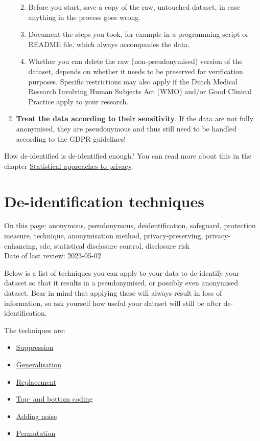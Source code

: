 \documentclass[
]{book}
\providecommand{\tightlist}{%
  \setlength{\itemsep}{0pt}\setlength{\parskip}{0pt}}
\begin{document}
\begin{enumerate}
  \begin{enumerate}
  \def\labelenumii{\alph{enumii}.}
  \tightlist
  \item
    Before you start, save a copy of the raw, untouched dataset, in case
    anything in the process goes wrong.
  \item
    Document the steps you took, for example in a programming script or README
    file, which always accompanies the data.
  \item
    Whether you can delete the raw (non-pseudonymised) version of the dataset,
    depends on whether it needs to be preserved for verification purposes. Specific
    restrictions may also apply if the Dutch Medical Research Involving Human
    Subjects Act (WMO) and/or Good Clinical Practice apply to your research.
  \end{enumerate}
\item
  \textbf{Treat the data according to their sensitivity}. If the data are not fully
  anonymised, they are pseudonymous and thus still need to be handled according to
  the GDPR guidelines!
\end{enumerate}

How de-identified is de-identified enough? You can read more about this in the
chapter \protect\hyperlink{statistical-privacy}{Statistical approaches to privacy}.

\hypertarget{deidentification-techniques}{%
\section{De-identification techniques}\label{deidentification-techniques}}

On this page: anonymous, pseudonymous, deidentification, safeguard, protection
measure, technique, anonymisation method, privacy-preserving, privacy-enhancing,
sdc, statistical disclosure control, disclosure risk\\
Date of last review: 2023-05-02

Below is a list of techniques you can apply to your data to de-identify your
dataset so that it results in a pseudonymised, or possibly even anonymised
dataset. Bear in mind that applying these will always result in loss of
information, so ask yourself how useful your dataset will still be after
de-identification.

The techniques are:

\begin{itemize}
\tightlist
\item
  \protect\hyperlink{suppression}{Suppression}
\item
  \protect\hyperlink{generalisation}{Generalisation}
\item
  \protect\hyperlink{replacement}{Replacement}
\item
  \protect\hyperlink{top-bottom-coding}{Top- and bottom coding}
\item
  \protect\hyperlink{adding-noise}{Adding noise}
\item
  \protect\hyperlink{permutation}{Permutation}
\end{itemize}
\end{document}
